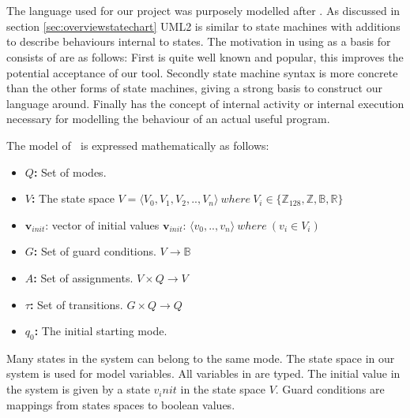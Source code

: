 \section{\plcchart}
\label{sec:statechartsem}

The language used for our project was purposely modelled after
 \cite{UML2}. As discussed 
in section \ref{sec:overviewstatechart} UML2 is similar to state 
machines with additions to describe behaviours internal to states.
The motivation in using  \cite{UML2}
as a basis for \emphasize{\plcchart} consists of are as follows: 
First  \cite{UML2}
is quite well known and popular, this improves the potential acceptance
of our tool. Secondly \cite{UML2}
state machine syntax is more concrete than the other forms of state
machines, giving a strong basis to construct our language around.
Finally \cite{UML2} has the
concept of internal activity or internal execution necessary for modelling
the behaviour of an actual useful program.

The model of \plcchart $\:$ is expressed mathematically as follows:

\begin{definition}
	\plcchart
	
\begin{itemize}
	\item \textbf{$Q$:} Set of modes.
	\item \textbf{$V$:} The state space $V = \langle V_0,V_1,V_2,..,V_n \rangle \: where \: V_{i}\in \lbrace \mathbb{Z}_{128}, \mathbb{Z}, \mathbb{B}, \mathbb{R} \rbrace$
	\item $\mathbf{v}_{init}$: vector of initial values $\mathbf{v}_{init}$: $\langle v_0,..,v_n \rangle \: where \: (v_i \in V_i)$
	\item \textbf{$G$:} Set of guard conditions. $V \rightarrow \mathbb{B}$
	\item \textbf{$A$:} Set of assignments. $V \times Q \rightarrow V$
	\item \textbf{$\tau$:} Set of transitions. $G \times Q \rightarrow Q$
	\item \textbf{$q_0$:} The initial starting mode.
\end{itemize}
\end{definition}

Many states in the system can belong to the same mode. The state space in our system is used for model variables. All variables in \emphasize{\plcchart} are typed. The initial value in the system is given by a state $v_init$ in the state space $V$.  Guard conditions are mappings from states spaces to boolean values.

